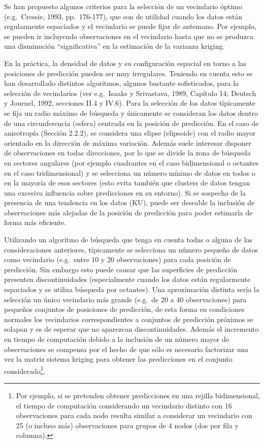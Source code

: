 \documentclass[
  spanish,
]{book}
\theoremstyle{break}
\theoremstyle{definition}
\theoremstyle{definition}
\theoremstyle{definition}
\theoremstyle{definition}
\theoremstyle{remark}
\begin{document}
Se han propuesto algunos criterios para la selección de un vecindario óptimo (e.g.~Cressie, 1993, pp.~176-177), que son de utilidad cuando los datos están regularmente espaciados y el vecindario se puede fijar de antemano.
Por ejemplo, se pueden ir incluyendo observaciones en el vecindario hasta que no se produzca una disminución ``significativa'' en la estimación de la varianza kriging.

En la práctica, la densidad de datos y su configuración espacial en torno a las posiciones de predicción pueden ser muy irregulares.
Teniendo en cuenta esto se han desarrollado distintos algoritmos, algunos bastante sofisticados, para la selección de vecindarios (ver e.g.~Isaaks y Srivastava, 1989, Capítulo 14; Deutsch y Journel, 1992, secciones II.4 y IV.6).
Para la selección de los datos típicamente se fija un radio máximo de búsqueda y únicamente se consideran los datos dentro de una circunferencia (esfera) centrada en la posición de predicción.
En el caso de anisotropía (Sección 2.2.2), se considera una elipse (elipsoide) con el radio mayor orientado en la dirección de máxima variación.
Además suele interesar disponer de observaciones en todas direcciones, por lo que se divide la zona de búsqueda en sectores angulares (por ejemplo cuadrantes en el caso bidimensional o octantes en el caso tridimensional) y se selecciona un número mínimo de datos en todos o en la mayoría de esos sectores (esto evita también que clusters de datos tengan una excesiva influencia sobre predicciones en su entorno).
Si se sospecha de la presencia de una tendencia en los datos (KU), puede ser deseable la inclusión de observaciones más alejadas de la posición de predicción para poder estimarla de forma más eficiente.

Utilizando un algoritmo de búsqueda que tenga en cuenta todas o alguna de las consideraciones anteriores, típicamente se selecciona un número pequeño de datos como vecindario (e.g.~entre 10 y 20 observaciones) para cada posición de predicción.
Sin embargo esto puede causar que las superficies de predicción presenten discontinuidades (especialmente cuando los datos están regularmente espaciados y se utiliza búsqueda por octantes).
Una aproximación distinta sería la selección un único vecindario más grande (e.g.~de 20 a 40 observaciones) para pequeños conjuntos de posiciones de predicción, de esta forma en condiciones normales los vecindarios correspondientes a conjuntos de predicción próximos se solapan y es de esperar que no aparezcan discontinuidades.
Además el incremento en tiempo de computación debido a la inclusión de un número mayor de observaciones se compensa por el hecho de que sólo es necesario factorizar una vez la matriz sistema kriging para obtener las predicciones en el conjunto considerado\footnote{Por ejemplo, si se pretenden obtener predicciones en una rejilla bidimensional, el tiempo de computación considerando un vecindario distinto con 16 observaciones para cada nodo resulta similar a considerar un vecindario con 25 (o incluso más) observaciones para grupos de 4 nodos (dos por fila y columna).}.
\end{document}
